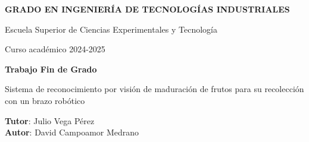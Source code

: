 \thispagestyle{empty}
\vspace{2cm}

\begin{figure}[htb]
  \centerline{}
\end{figure}

\begin{center}
  {\Large {\bf GRADO EN INGENIERÍA DE TECNOLOGÍAS INDUSTRIALES}}
  \vspace{5mm}
 
  {\large {Escuela Superior de Ciencias Experimentales y Tecnología}}
  \vspace{5mm}

  {\large {Curso académico 2024-2025}}

  \vspace{1cm}

  {\large {\bf Trabajo Fin de Grado}}

  \vspace{2cm}

  {\Large {Sistema de reconocimiento por visión de maduración de frutos para su recolección con un brazo robótico\\ [1cm] }}

  \vspace{5cm}
  {\bf Tutor}: Julio Vega Pérez \\
  {\bf Autor}: David Campoamor Medrano
\end{center}

\clearpage
\thispagestyle{empty}
